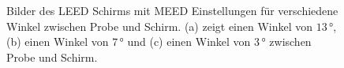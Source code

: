 \begin{figure}[H]
    \centering
    \qquad
    \qquad
    \caption{Bilder des LEED Schirms mit MEED Einstellungen für verschiedene Winkel zwischen Probe und Schirm. 
            (a) zeigt einen Winkel von $13\,\si{\degree}$, (b) einen Winkel von $7\,\si{\degree}$ und (c) einen Winkel von $3\,\si{\degree}$ zwischen Probe und Schirm.}%
    \label{fig:MEED-Bilder}
  \end{figure}

